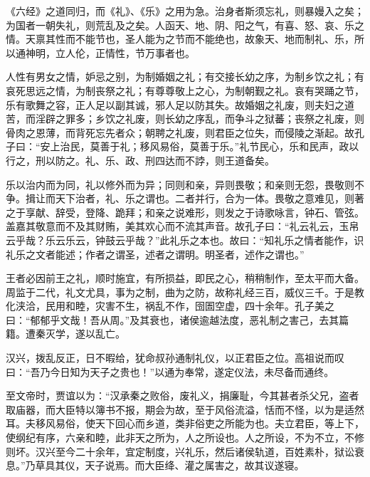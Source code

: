 \documentclass[]{article}
\begin{document}
《六经》之道同归，而《礼》、《乐》之用为急。治身者斯须忘礼，则暴嫚入之矣；为国者一朝失礼，则荒乱及之矣。人函天、地、阴、阳之气，有喜、怒、哀、乐之情。天禀其性而不能节也，圣人能为之节而不能绝也，故象天、地而制礼、乐，所以通神明，立人伦，正情性，节万事者也。

人性有男女之情，妒忌之别，为制婚姻之礼；有交接长幼之序，为制乡饮之礼；有哀死思远之情，为制丧祭之礼；有尊尊敬上之心，为制朝觐之礼。哀有哭踊之节，乐有歌舞之容，正人足以副其诚，邪人足以防其失。故婚姻之礼废，则夫妇之道苦，而淫辟之罪多；乡饮之礼废，则长幼之序乱，而争斗之狱蕃；丧祭之礼废，则骨肉之恩薄，而背死忘先者众；朝聘之礼废，则君臣之位失，而侵陵之渐起。故孔子曰：``安上治民，莫善于礼；移风易俗，莫善于乐。''礼节民心，乐和民声，政以行之，刑以防之。礼、乐、政、刑四达而不誖，则王道备矣。

乐以治内而为同，礼以修外而为异；同则和亲，异则畏敬；和亲则无怨，畏敬则不争。揖让而天下治者，礼、乐之谓也。二者并行，合为一体。畏敬之意难见，则著之于享献、辞受，登降、跪拜；和亲之说难形，则发之于诗歌咏言，钟石、管弦。盖嘉其敬意而不及其财贿，美其欢心而不流其声音。故孔子曰：``礼云礼云，玉帛云乎哉？乐云乐云，钟鼓云乎哉？''此礼乐之本也。故曰：``知礼乐之情者能作，识礼乐之文者能述；作者之谓圣，述者之谓明。明圣者，述作之谓也。''

王者必因前王之礼，顺时施宜，有所损益，即民之心，稍稍制作，至太平而大备。周监于二代，礼文尤具，事为之制，曲为之防，故称礼经三百，威仪三千。于是教化浃洽，民用和睦，灾害不生，祸乱不作，囹圄空虚，四十余年。孔子美之曰：``郁郁乎文哉！吾从周。''及其衰也，诸侯逾越法度，恶礼制之害己，去其篇籍。遭秦灭学，遂以乱亡。

汉兴，拨乱反正，日不暇给，犹命叔孙通制礼仪，以正君臣之位。高祖说而叹曰：``吾乃今日知为天子之贵也！''以通为奉常，遂定仪法，未尽备而通终。

至文帝时，贾谊以为：``汉承秦之败俗，废礼义，捐廉耻，今其甚者杀父兄，盗者取庙器，而大臣特以簿书不报，期会为故，至于风俗流溢，恬而不怪，以为是适然耳。夫移风易俗，使天下回心而乡道，类非俗吏之所能为也。夫立君臣，等上下，使纲纪有序，六亲和睦，此非天之所为，人之所设也。人之所设，不为不立，不修则坏。汉兴至今二十余年，宜定制度，兴礼乐，然后诸侯轨道，百姓素朴，狱讼衰息。''乃草具其仪，天子说焉。而大臣绛、灌之属害之，故其议遂寝。
\end{document}

